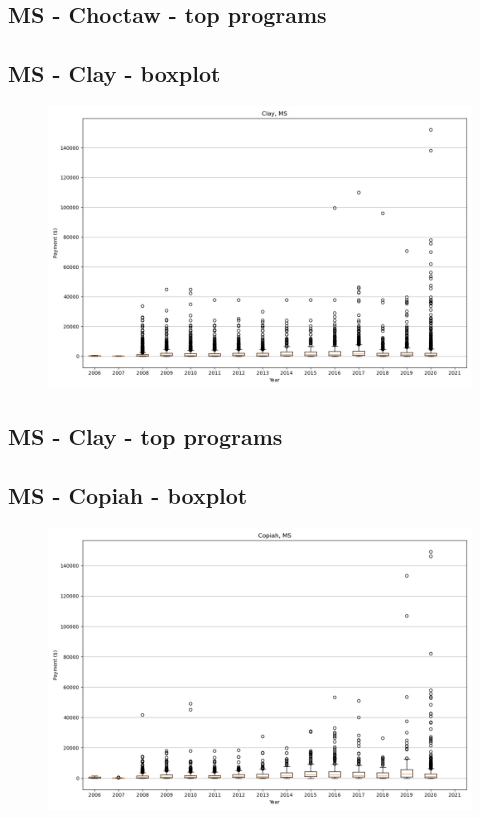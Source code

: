\subsection*{MS - Choctaw - top programs}

\newpage
\subsection*{MS - Clay - boxplot}
\begin{figure}[h]
\centering
\includegraphics[width=7in]{../output/boxplots/counties/Clay-MS_boxplot.png}
\end{figure}


\subsection*{MS - Clay - top programs}

\newpage
\subsection*{MS - Copiah - boxplot}
\begin{figure}[h]
\centering
\includegraphics[width=7in]{../output/boxplots/counties/Copiah-MS_boxplot.png}
\end{figure}



